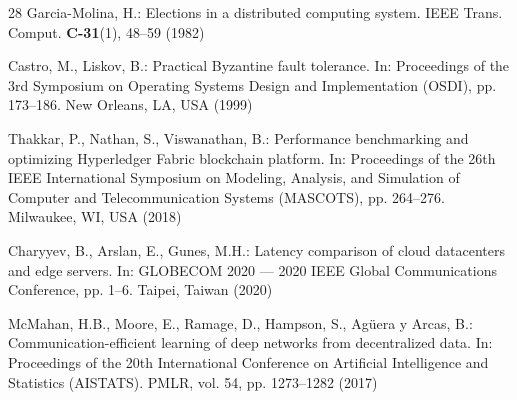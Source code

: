 \documentclass{llncs}
\begin{document}
\begin{thebibliography}{28}
Garcia-Molina, H.: Elections in a distributed computing system. IEEE Trans.
Comput. \textbf{C-31}(1), 48--59 (1982)

Castro, M., Liskov, B.: Practical Byzantine fault tolerance. In: Proceedings
of the 3rd Symposium on Operating Systems Design and Implementation (OSDI),
pp. 173--186. New Orleans, LA, USA (1999)

Thakkar, P., Nathan, S., Viswanathan, B.: Performance benchmarking and
optimizing Hyperledger Fabric blockchain platform. In: Proceedings of the
26th IEEE International Symposium on Modeling, Analysis, and Simulation of
Computer and Telecommunication Systems (MASCOTS), pp. 264--276. Milwaukee,
WI, USA (2018)

Charyyev, B., Arslan, E., Gunes, M.H.: Latency comparison of cloud datacenters
and edge servers. In: GLOBECOM 2020 --- 2020 IEEE Global Communications
Conference, pp. 1--6. Taipei, Taiwan (2020)

McMahan, H.B., Moore, E., Ramage, D., Hampson, S., Ag\"{u}era y Arcas, B.:
Communication-efficient learning of deep networks from decentralized data.
In: Proceedings of the 20th International Conference on Artificial
Intelligence and Statistics (AISTATS). PMLR, vol. 54, pp. 1273--1282 (2017)

\end{thebibliography}
\end{document}

